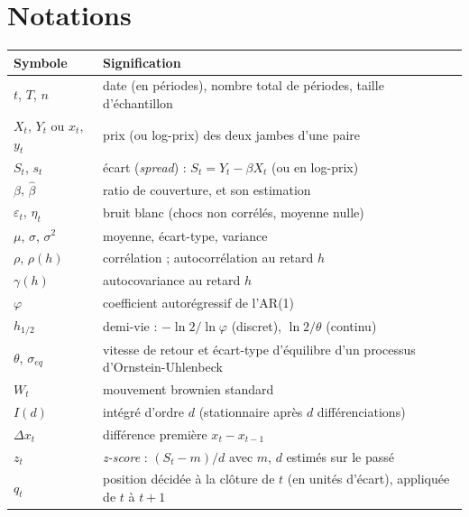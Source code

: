 


\chapter{Notations}
\label{ann:notations}

\begin{center}\small
\begin{longtable}{>{\raggedright}p{3.2cm}>{\raggedright\arraybackslash}p{10.6cm}}
\toprule
Symbole & Signification \\
\midrule
\endhead
$t$, $T$, $n$ & date (en périodes), nombre total de périodes, taille d'échantillon \\
$X_t$, $Y_t$ ou $x_t$, $y_t$ & prix (ou log-prix) des deux jambes d'une paire \\
$S_t$, $s_t$ & écart (\emph{spread}) : $S_t = Y_t - \beta X_t$ (ou en log-prix) \\
$\beta$, $\hat\beta$ & ratio de couverture, et son estimation \\
$\varepsilon_t$, $\eta_t$ & bruit blanc (chocs non corrélés, moyenne nulle) \\
$\mu$, $\sigma$, $\sigma^2$ & moyenne, écart-type, variance \\
$\rho$, $\rho(h)$ & corrélation ; autocorrélation au retard $h$ \\
$\gamma(h)$ & autocovariance au retard $h$ \\
$\varphi$ & coefficient autorégressif de l'AR(1) \\
$h_{1/2}$ & demi-vie : $-\ln2/\ln\varphi$ (discret), $\ln2/\theta$ (continu) \\
$\theta$, $\sigma_{eq}$ & vitesse de retour et écart-type d'équilibre d'un processus d'Ornstein-Uhlenbeck \\
$W_t$ & mouvement brownien standard \\
$I(d)$ & intégré d'ordre $d$ (stationnaire après $d$ différenciations) \\
$\Delta x_t$ & différence première $x_t - x_{t-1}$ \\
$z_t$ & \emph{z-score} : $(S_t - m)/d$ avec $m$, $d$ estimés sur le passé \\
$q_t$ & position décidée à la clôture de $t$ (en unités d'écart), appliquée de $t$ à $t+1$ \\

\end{longtable}
\end{center}
